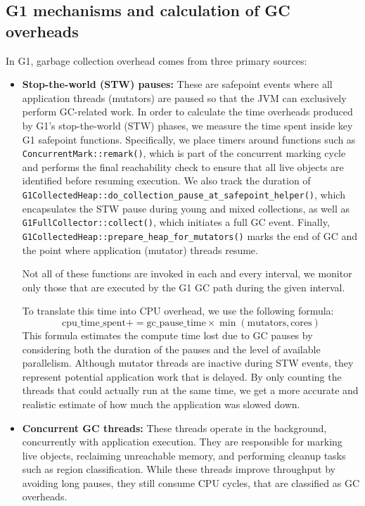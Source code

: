 \subsection{G1 mechanisms and calculation of GC overheads}
In G1, garbage collection overhead comes from three primary sources:

\begin{itemize}
  \item \textbf{Stop-the-world (STW) pauses:} These are safepoint events
  where all application threads (mutators) are paused so that the JVM can exclusively perform 
  GC-related work. In order to calculate the time overheads produced by G1’s stop-the-world (STW) phases, we measure the time spent inside key G1 safepoint functions. 
  Specifically, we place timers around functions such as \texttt{ConcurrentMark::remark()}, which is part of the concurrent marking cycle and performs the final reachability check to ensure that all live objects are identified before resuming execution. 
  We also track the duration of \texttt{G1CollectedHeap::do\allowbreak\_collection\allowbreak\_pause\allowbreak\_at\allowbreak\_safepoint\allowbreak\_helper()}, which encapsulates the STW pause during young and mixed collections, as well as \texttt{G1FullCollector::collect()}, which initiates a full GC event. 
  Finally, \texttt{G1CollectedHeap::prepare\_heap\_for\_mutators()} marks the end of GC and the point where application (mutator) threads resume.

  Not all of these functions are invoked in each and every interval, we monitor only those that are executed by the G1 GC path during the given interval. 

  To translate this time into CPU overhead, we use the following formula:
  \[
  \text{cpu\_time\_spent} += \text{gc\_pause\_time} \times \min(\text{mutators}, \text{cores})
  \]
  This formula estimates the compute time lost due to GC pauses by considering both the duration of the pauses and the level of available parallelism. 
  Although mutator threads are inactive during STW events, they represent potential application work that is delayed. 
  By only counting the threads that could actually run at the same time, we get a more accurate and realistic estimate of how much the application was slowed down. 

  \item \textbf{Concurrent GC threads:} These threads operate in the background,
  concurrently with application execution. They are responsible for marking live 
  objects, reclaiming unreachable memory, and performing cleanup tasks such as region 
  classification. While these threads improve throughput by avoiding long pauses, they 
  still consume CPU cycles, that are classified as GC overheads.


\end{itemize}
